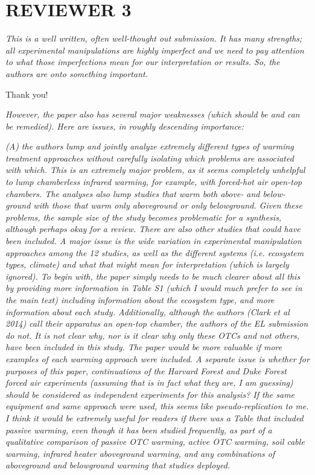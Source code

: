 \documentclass[11pt,a4paper]{letter}
\begin{document}
\section {REVIEWER 3}

\emph{This is a well written, often well-thought out submission. It has many strengths; all experimental manipulations are highly imperfect and we need to pay attention to what those imperfections mean for our interpretation or results. So, the authors are onto something important.}

\par Thank you!

\emph{However, the paper also has several major weaknesses (which should be and can be remedied). Here are issues, in roughly descending importance:}

\emph{(A) the authors lump and jointly analyze extremely different types of warming treatment approaches without carefully isolating which problems are associated with which. This is an extremely major problem, as it seems completely unhelpful to lump chamberless infrared warming, for example, with forced-hot air open-top chambers. The analyses also lump studies that warm both above- and below-ground with those that warm only aboveground or only belowground. Given these problems, the sample size of the study becomes problematic for a synthesis, although perhaps okay for a review. There are also other studies that could have been included. A major issue is the wide variation in experimental manipulation approaches among the 12 studies, as well as the different systems (i.e. ecosystem types, climate) and what that might mean for interpretation (which is largely ignored). To begin with, the paper simply needs to be much clearer about all this by providing more information in Table S1 (which I would much prefer to see in the main text) including information about the ecosystem type, and more information about each study. Additionally, although the authors (Clark et al 2014) call their apparatus an open-top chamber, the authors of the EL submission do not. It is not clear why, nor is it clear why only these OTCs and not others, have been included in this study. The paper would be more valuable if more examples of each warming approach were included. A separate issue is whether for purposes of this paper, continuations of the Harvard Forest and Duke Forest forced air experiments (assuming that is in fact what they are, I am guessing) should be considered as independent experiments for this analysis? If the same equipment and same approach were used, this seems like pseudo-replication to me. I think it would be extremely useful for readers if there was a Table that included passive warming, even though it has been studied frequently, as part of a qualitative comparison of passive OTC warming, active OTC warming, soil cable warming, infrared heater aboveground warming, and any combinations of aboveground and belowground warming that studies deployed.}
\end{document}

